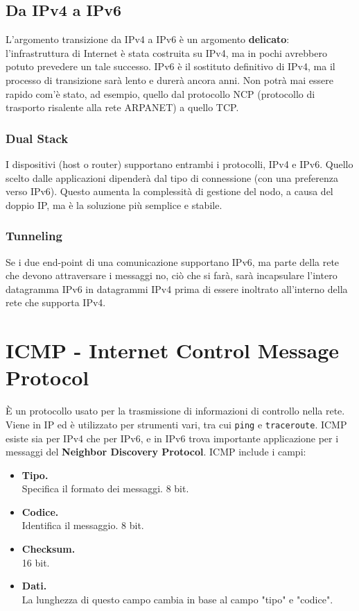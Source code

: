 \subsection{Da IPv4 a IPv6}
L'argomento transizione da IPv4 a IPv6 è un argomento \textbf{delicato}: l'infrastruttura di Internet è stata costruita su IPv4, ma in pochi avrebbero potuto prevedere un tale successo. IPv6 è il sostituto definitivo di IPv4, ma il processo di transizione sarà lento e durerà ancora anni. Non potrà mai essere rapido com'è stato, ad esempio, quello dal protocollo NCP (protocollo di trasporto risalente alla rete ARPANET) a quello TCP.

\subsubsection{Dual Stack}
I dispositivi (host o router) supportano entrambi i protocolli, IPv4 e IPv6. Quello scelto dalle applicazioni dipenderà dal tipo di connessione (con una preferenza verso IPv6).
Questo aumenta la complessità di gestione del nodo, a causa del doppio IP, ma è la soluzione più semplice e stabile.

\subsubsection{Tunneling}
Se i due end-point di una comunicazione supportano IPv6, ma parte della rete che devono attraversare i messaggi no, ciò che si farà, sarà incapsulare l'intero datagramma IPv6 in datagrammi IPv4 prima di essere inoltrato all'interno della rete che supporta IPv4.

\newpage
\section{ICMP - Internet Control Message Protocol}
È un protocollo usato per la trasmissione di informazioni di controllo nella rete. Viene in IP ed è utilizzato per strumenti vari, tra cui \verb!ping! e \verb|traceroute|.
ICMP esiste sia per IPv4 che per IPv6, e in IPv6 trova importante applicazione per i messaggi del \textbf{Neighbor Discovery Protocol}. ICMP include i campi:
\begin{itemize}
	\item \textbf{Tipo.}\\
	Specifica il formato dei messaggi. 8 bit.
	\item \textbf{Codice.}\\
	Identifica il messaggio. 8 bit.
	\item \textbf{Checksum.}\\
	16 bit.
	\item \textbf{Dati.}\\
	La lunghezza di questo campo cambia in base al campo "tipo" e "codice".
\end{itemize}

